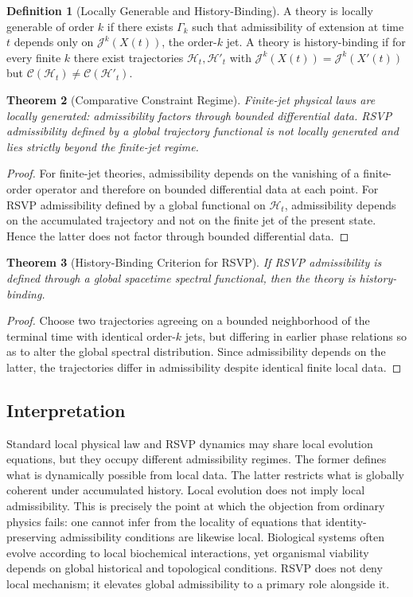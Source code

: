 \documentclass[12pt, a4paper]{article}
\theoremstyle{plain}
\newtheorem{theorem}{Theorem}[section]
\theoremstyle{definition}
\newtheorem{definition}[theorem]{Definition}
\theoremstyle{remark}
\begin{document}
\begin{definition}[Locally Generable and History-Binding]
A theory is locally generable of order $k$ if there exists $\Gamma_k$ such that admissibility of extension at time $t$ depends only on $\mathcal{J}^k(X(t))$, the order-$k$ jet. A theory is history-binding if for every finite $k$ there exist trajectories $\mathcal{H}_t, \mathcal{H}'_t$ with $\mathcal{J}^k(X(t)) = \mathcal{J}^k(X'(t))$ but $\mathcal{C}(\mathcal{H}_t) \neq \mathcal{C}(\mathcal{H}'_t)$.
\end{definition}

\begin{theorem}[Comparative Constraint Regime]
Finite-jet physical laws are locally generated: admissibility factors through bounded differential data. RSVP admissibility defined by a global trajectory functional is not locally generated and lies strictly beyond the finite-jet regime.
\end{theorem}

\begin{proof}
For finite-jet theories, admissibility depends on the vanishing of a finite-order operator and therefore on bounded differential data at each point. For RSVP admissibility defined by a global functional on $\mathcal{H}_t$, admissibility depends on the accumulated trajectory and not on the finite jet of the present state. Hence the latter does not factor through bounded differential data.
\end{proof}

\begin{theorem}[History-Binding Criterion for RSVP]
If RSVP admissibility is defined through a global spacetime spectral functional, then the theory is history-binding.
\end{theorem}

\begin{proof}
Choose two trajectories agreeing on a bounded neighborhood of the terminal time with identical order-$k$ jets, but differing in earlier phase relations so as to alter the global spectral distribution. Since admissibility depends on the latter, the trajectories differ in admissibility despite identical finite local data.
\end{proof}

\subsection{Interpretation}

Standard local physical law and RSVP dynamics may share local evolution equations, but they occupy different admissibility regimes. The former defines what is dynamically possible from local data. The latter restricts what is globally coherent under accumulated history. Local evolution does not imply local admissibility. This is precisely the point at which the objection from ordinary physics fails: one cannot infer from the locality of equations that identity-preserving admissibility conditions are likewise local. Biological systems often evolve according to local biochemical interactions, yet organismal viability depends on global historical and topological conditions. RSVP does not deny local mechanism; it elevates global admissibility to a primary role alongside it.
\end{document}
